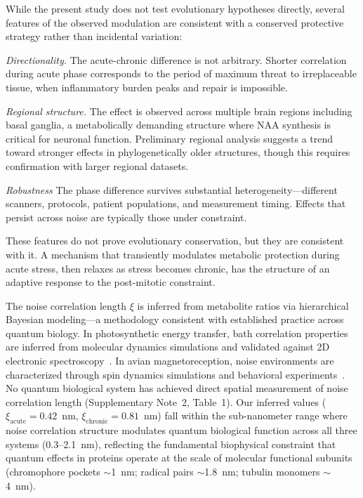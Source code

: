 \documentclass[10pt,a4paper]{article}
\begin{document}
While the present study does not test evolutionary hypotheses directly, several features of the observed modulation are consistent with a conserved protective strategy rather than incidental variation:

\textit{Directionality.} The acute-chronic difference is not arbitrary. Shorter correlation during acute phase corresponds to the period of maximum threat to irreplaceable tissue, when inflammatory burden peaks and repair is impossible.

\textit{Regional structure.} The effect is observed across multiple brain regions including basal ganglia, a metabolically demanding structure where NAA synthesis is critical for neuronal function. Preliminary regional analysis suggests a trend toward stronger effects in phylogenetically older structures, though this requires confirmation with larger regional datasets.

\textit{Robustness} The phase difference survives substantial heterogeneity---different scanners, protocols, patient populations, and measurement timing. Effects that persist across noise are typically those under constraint.

These features do not prove evolutionary conservation, but they are consistent with it. A mechanism that transiently modulates metabolic protection during acute stress, then relaxes as stress becomes chronic, has the structure of an adaptive response to the post-mitotic constraint.

The noise correlation length $\xi$ is inferred from metabolite ratios via hierarchical Bayesian modeling---a methodology consistent with established practice across quantum biology. In photosynthetic energy transfer, bath correlation properties are inferred from molecular dynamics simulations and validated against 2D electronic spectroscopy~\cite{Olbrich2011,Kim2025}. In avian magnetoreception, noise environments are characterized through spin dynamics simulations and behavioral experiments~\cite{Bandyopadhyay2012,Kattnig2024}. No quantum biological system has achieved direct spatial measurement of noise correlation length (Supplementary Note~2, Table~1). Our inferred values ($\xi_{\text{acute}} = 0.42$~nm, $\xi_{\text{chronic}} = 0.81$~nm) fall within the sub-nanometer range where noise correlation structure modulates quantum biological function across all three systems (0.3--2.1~nm), reflecting the fundamental biophysical constraint that quantum effects in proteins operate at the scale of molecular functional subunits (chromophore pockets $\sim$1~nm; radical pairs $\sim$1.8~nm; tubulin monomers $\sim$4~nm).
\end{document}
